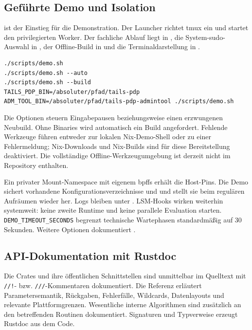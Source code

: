 \documentclass[12pt,a4paper]{article}
\begin{document}
\subsection{Geführte Demo und Isolation}
 ist der Einstieg für die Demonstration. Der Launcher richtet
tmux ein und startet den privilegierten Worker. Der fachliche Ablauf liegt in
, die System-sudo-Auswahl in
, der Offline-Build in
 und die Terminaldarstellung in .
\begin{lstlisting}
./scripts/demo.sh
./scripts/demo.sh --auto
./scripts/demo.sh --build
TAILS_PDP_BIN=/absoluter/pfad/tails-pdp ADM_TOOL_BIN=/absoluter/pfad/tails-pdp-admintool ./scripts/demo.sh
\end{lstlisting}
Die Optionen steuern Eingabepausen beziehungsweise einen erzwungenen Neubuild.
Ohne Binaries wird automatisch ein Build angefordert. Fehlende Werkzeuge führen
entweder zur lokalen Nix-Demo-Shell oder zu einer Fehlermeldung; Nix-Downloads
und Nix-Builds sind für diese Bereitstellung deaktiviert. Die vollständige
Offline-Werkzeugumgebung ist derzeit nicht im Repository enthalten.

Ein privater Mount-Namespace mit eigenem bpffs erhält die Host-Pins. Die Demo
sichert vorhandene Konfigurationsverzeichnisse und  und stellt
sie beim regulären Aufräumen wieder her. Logs bleiben unter .
LSM-Hooks wirken weiterhin systemweit: keine zweite Runtime und keine parallele
Evaluation starten. \texttt{DEMO\_TIMEOUT\_SECONDS} begrenzt technische Wartephasen
standardmäßig auf 30 Sekunden. Weitere Optionen dokumentiert .

\subsection{API-Dokumentation mit Rustdoc}
Die Crates und ihre öffentlichen Schnittstellen sind unmittelbar im Quelltext mit
\texttt{//!}- bzw. \texttt{///}-Kommentaren dokumentiert. Die Referenz erläutert
Parametersemantik, Rückgaben, Fehlerfälle, Wildcards, Datenlayouts und relevante
Plattformgrenzen. Wesentliche interne Algorithmen sind zusätzlich an den betreffenden
Routinen dokumentiert. Signaturen und Typverweise erzeugt Rustdoc aus dem Code.
\end{document}
